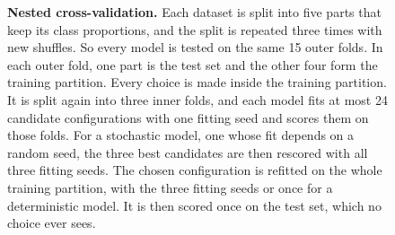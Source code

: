 \begin{figure}[!htbp]
\begin{tikzpicture}
\end{tikzpicture}
\caption{\textbf{Nested cross-validation.} Each dataset is split into five parts that keep its class proportions, and the split is repeated three times with new shuffles. So every model is tested on the same 15 outer folds. In each outer fold, one part is the test set and the other four form the training partition. Every choice is made inside the training partition. It is split again into three inner folds, and each model fits at most 24 candidate configurations with one fitting seed and scores them on those folds. For a stochastic model, one whose fit depends on a random seed, the three best candidates are then rescored with all three fitting seeds. The chosen configuration is refitted on the whole training partition, with the three fitting seeds or once for a deterministic model. It is then scored once on the test set, which no choice ever sees.}
\label{fig:s-nested-cv}
\end{figure}
